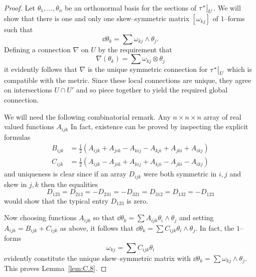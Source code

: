 \documentclass[../main]{subfiles}
\begin{document}
\begin{proof}
Let $\theta_1, \ldots, \theta_n$ be an orthonormal basis for the sections of $\tau^\ast \big{|}_U$. We will show that there is one and only one skew--symmetric matrix $[\omega_{kj}]$ of $1$--forms such that \[\dd  \theta_k = \sum \omega_{kj} \wedge \theta_j.\] Defining a connection $\nabla$ on $U$ by the requirement that \[\nabla(\theta_k) = \sum \omega_{kj} \otimes \theta_j\] it evidently follows that $\nabla$ is the unique symmetric connection for $\tau^\ast \big{|}_U$ which is compatible with the metric. Since these local connections are unique, they agree on intersections $U \cap U'$ and so piece together to yield the required global connection. 

We will need the following combinatorial remark. Any $n \times n \times n$ array of real valued functions $A_{ijk}$  In fact, existence can be proved by inspecting the explicit formulas
\begin{align*}
B_{ijk} & = \frac 1 2 (A_{ijk} + A_{jik} - A_{kij} - A_{kji} + A_{jki} + A_{ikj}) \\ C_{ijk} & = \frac 1 2 (A_{ijk} - A_{jik} + A_{kij} + A_{kji} - A_{jki} - A_{ikj})
\end{align*}
and uniqueness is clear since if an array $D_{ijk}$ were both symmetric in $i, j$ and skew in $j, k$ then the equalities \[D_{123} = D_{213} = -D_{231} = -D_{321} = D_{312} = D_{132} = -D_{123}\] would show that the typical entry $D_{123}$ is zero. 

Now choosing functions $A_{ijk}$ so that $\displaystyle \dd  \theta_k = \sum A_{ijk} \theta_i \wedge \theta_j$ and setting \newline $A_{ijk} = B_{ijk} + C_{ijk}$ as above, it follows that $\displaystyle \dd  \theta_k = \sum C_{ijk} \theta_i \wedge \theta_j$. In fact, the $1$--forms \[\omega_{kj} = \sum C_{ijk} \theta_i\] evidently constitute the unique skew--symmetric matrix with $\displaystyle \dd \theta_k = \sum \omega_{kj} \wedge \theta_j$. This proves Lemma~\ref{lem:C.8}. 
\end{proof}
\end{document}
